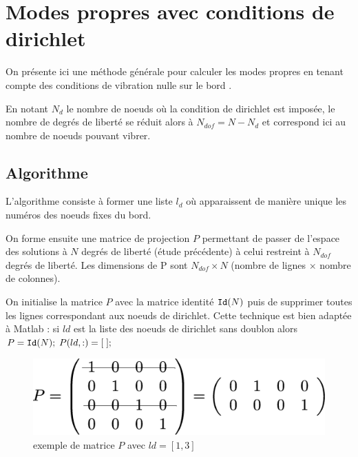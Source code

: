 \documentclass[a4paper, 12pt]{article}
\newcommand{\matlabscript}[2]
  {\begin{itemize}\item[]\end{itemize}}
\begin{document}
\section{Modes propres avec conditions de dirichlet}

On présente ici une méthode générale pour calculer les modes propres en 
tenant compte des conditions de vibration nulle sur le bord .

En notant $N_d$ le nombre de noeuds où  la condition de dirichlet est imposée, 
le nombre de degrés de liberté se réduit alors à $N_{dof}=N-N_d$ et correspond 
ici au nombre de noeuds pouvant vibrer.


\subsection{Algorithme}

L'algorithme consiste à former une liste $l_{d}$ où apparaissent de 
manière unique les numéros des noeuds fixes du bord. 

On forme  ensuite une matrice de projection $P$ permettant de passer de l'espace des solutions à $N$ degrés de liberté (étude précédente) à celui restreint à $N_{dof}$ degrés de liberté.
Les dimensions de P sont $N_{dof} \times N$ (nombre de lignes $\times$ nombre de colonnes).

On initialise la matrice $P$ avec  la matrice identité ${\tt Id}(N)$
puis de supprimer toutes les lignes correspondant aux noeuds de dirichlet. Cette technique
est bien adaptée à Matlab : si $ld$ est la liste des noeuds de dirichlet sans doublon alors \\
$P={\tt Id}(N); \; P(ld, :)=[ \;];$\\

\begin{figure}[!h]
\centering
\includegraphics[scale=0.25]{matP.eps}
\caption{exemple de matrice $P$ avec $ld=[1, 3]$}
\label{matP}
\end{figure}
\end{document}
